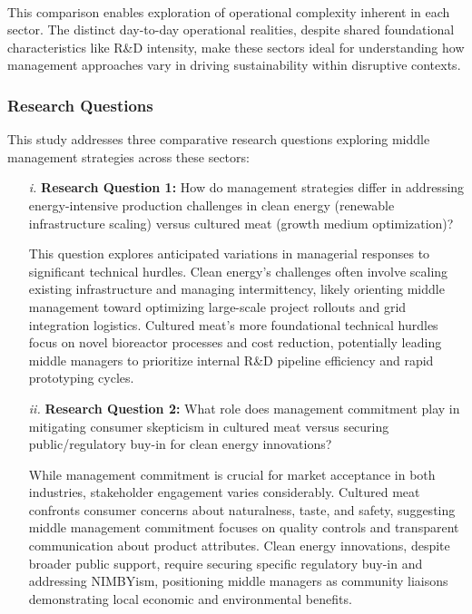 	\paragraph*{} This comparison enables exploration of operational complexity inherent in each sector. The distinct day-to-day operational realities, despite shared foundational characteristics like R\&D intensity, make these sectors ideal for understanding how management approaches vary in driving sustainability within disruptive contexts.
		
	\subsubsection{Research Questions}
	This study addresses three comparative research questions exploring middle management strategies across these sectors:
	\begin{enumerate}
		\item[\textit{i.}] \textbf{Research Question 1:} How do management strategies differ in addressing energy-intensive production challenges in clean energy (renewable infrastructure scaling) versus cultured meat (growth medium optimization)?
		
		This question explores anticipated variations in managerial responses to significant technical hurdles. Clean energy’s challenges often involve scaling existing infrastructure and managing intermittency, likely orienting middle management toward optimizing large-scale project rollouts and grid integration logistics. Cultured meat’s more foundational technical hurdles focus on novel bioreactor processes and cost reduction, potentially leading middle managers to prioritize internal R\&D pipeline efficiency and rapid prototyping cycles.
		
		\item[\textit{ii.}] \textbf{Research Question 2:} What role does management commitment play in mitigating consumer skepticism in cultured meat versus securing public/regulatory buy-in for clean energy innovations?
		
		While management commitment is crucial for market acceptance in both industries, stakeholder engagement varies considerably. Cultured meat confronts consumer concerns about naturalness, taste, and safety, suggesting middle management commitment focuses on quality controls and transparent communication about product attributes. Clean energy innovations, despite broader public support, require securing specific regulatory buy-in and addressing NIMBYism, positioning middle managers as community liaisons demonstrating local economic and environmental benefits.
		
	\end{enumerate}
	
